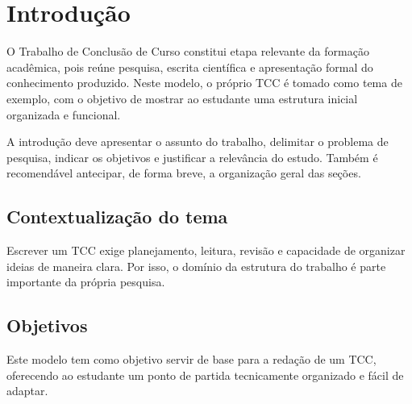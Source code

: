 
\chapter{Introdução}

O Trabalho de Conclusão de Curso constitui etapa relevante da formação acadêmica, pois reúne pesquisa, escrita científica e apresentação formal do conhecimento produzido. Neste modelo, o próprio TCC é tomado como tema de exemplo, com o objetivo de mostrar ao estudante uma estrutura inicial organizada e funcional.

A introdução deve apresentar o assunto do trabalho, delimitar o problema de pesquisa, indicar os objetivos e justificar a relevância do estudo. Também é recomendável antecipar, de forma breve, a organização geral das seções.

\section{Contextualização do tema}

Escrever um TCC exige planejamento, leitura, revisão e capacidade de organizar ideias de maneira clara. Por isso, o domínio da estrutura do trabalho é parte importante da própria pesquisa.

\section{Objetivos}

Este modelo tem como objetivo servir de base para a redação de um TCC, oferecendo ao estudante um ponto de partida tecnicamente organizado e fácil de adaptar.
